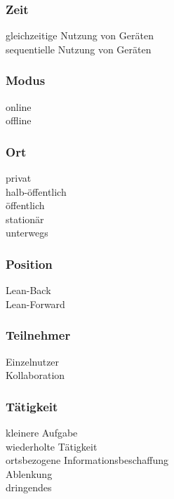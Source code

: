 \subsubsection*{Zeit}

\checkbox{\simultaneously} gleichzeitige Nutzung von Geräten \\
\checkbox{\sequentially} sequentielle Nutzung von Geräten 

\subsubsection*{Modus}
\checkbox{\online} online \\
\checkbox{\offline} offline 

\subsubsection*{Ort}
\checkbox{\private} privat \\
\checkbox{\semipublic} halb-öffentlich \\
\checkbox{\public} öffentlich \\
\checkbox{\stationary} stationär \\
\checkbox{\onthego} unterwegs 

\subsubsection*{Position}
\checkbox{\leanback} Lean-Back \\
\checkbox{\leanforward} Lean-Forward 


\subsubsection*{Teilnehmer}
\checkbox{\single} Einzelnutzer \\
\checkbox{\collaboration} Kollaboration 

\subsubsection*{Tätigkeit}
\checkbox{\smalltask} kleinere Aufgabe \\
\checkbox{\repeatedtask} wiederholte Tätigkeit \\
\checkbox{\locationbased} ortsbezogene Informationsbeschaffung \\
\checkbox{\distraction} Ablenkung \\
\checkbox{\urgent} dringendes 

